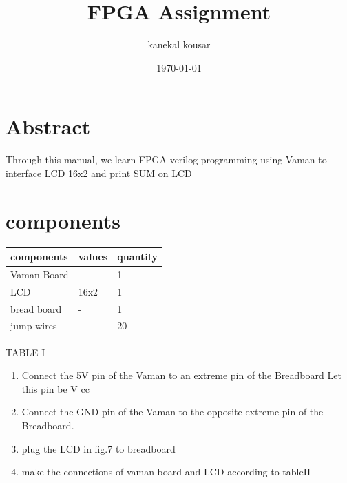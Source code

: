 \documentclass[twocolumn,13pt]{article}
\begin{document}
\title{\textbf{FPGA Assignment}}

\author{kanekal kousar}
\date{\today}
\maketitle
\section*{Abstract}
  Through this manual, we learn FPGA verilog programming using Vaman to interface LCD 16x2 and print SUM on LCD
\section*{components}
     \begin{tabular}{ |p{3cm}|p{1.5cm}|p{1.5cm}| }
 \hline
 \setlength{\tabcolsep}{3pt}
components & values & quantity \\
\hline
 Vaman Board &   - & 1\\
 LCD &16x2 & 1\\
 bread board  &-& 1\\
 jump wires&  - & 20\\
 \hline
\end{tabular}
\begin{center}
    TABLE I
\end{center}

\begin{enumerate}
    \item Connect the 5V pin of the Vaman to an extreme pin of the Breadboard Let this pin be V cc 
    \item Connect the GND pin of the Vaman to the opposite extreme pin of the Breadboard.
     \item plug the LCD in fig.7 to breadboard
    \item make the connections of vaman board and LCD according to tableII
   
\end{enumerate}
\end{document}

